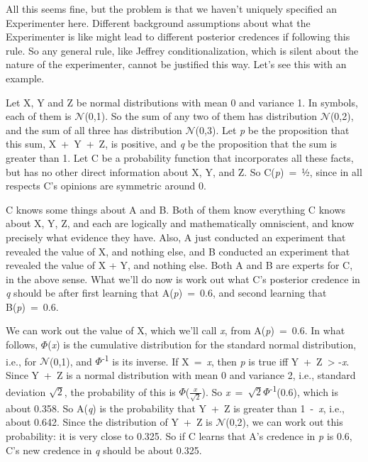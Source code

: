 \documentclass[
  10pt,
  letterpaper,
  DIV=11,
  numbers=noendperiod,
  twoside]{scrartcl}
\begin{document}
All this seems fine, but the problem is that we haven't uniquely
specified an Experimenter here. Different background assumptions about
what the Experimenter is like might lead to different posterior
credences if following this rule. So any general rule, like Jeffrey
conditionalization, which is silent about the nature of the
experimenter, cannot be justified this way. Let's see this with an
example.

Let X, Y and Z be normal distributions with mean 0 and variance 1. In
symbols, each of them is \(\mathcal{N}\)(0,1). So the sum of any two of
them has distribution \(\mathcal{N}\)(0,2), and the sum of all three has
distribution \(\mathcal{N}\)(0,3). Let \emph{p} be the proposition that
this sum, X~+~Y~+~Z, is positive, and \emph{q} be the proposition that
the sum is greater than 1. Let C be a probability function that
incorporates all these facts, but has no other direct information about
X, Y, and Z. So C(\emph{p})~=~½, since in all respects C's opinions are
symmetric around 0.

C knows some things about A and B. Both of them know everything C knows
about X, Y, Z, and each are logically and mathematically omniscient, and
know precisely what evidence they have. Also, A just conducted an
experiment that revealed the value of X, and nothing else, and B
conducted an experiment that revealed the value of X + Y, and nothing
else. Both A and B are experts for C, in the above sense. What we'll do
now is work out what C's posterior credence in \emph{q} should be after
first learning that A(\emph{p})~=~0.6, and second learning that
B(\emph{p})~=~0.6.

We can work out the value of X, which we'll call \emph{x}, from
A(\emph{p})~=~0.6. In what follows, \(\Phi\)(\emph{x}) is the cumulative
distribution for the standard normal distribution, i.e., for
\(\mathcal{N}\)(0,1), and \(\Phi\)\textsuperscript{-1} is its inverse.
If X~=~\emph{x}, then \emph{p} is true iff Y~+~Z~\textgreater{}
-\emph{x}. Since Y~+~Z is a normal distribution with mean 0 and variance
2, i.e., standard deviation \(\sqrt{2}\), the probability of this is
\(\Phi\)(\(\frac{x}{\sqrt{2}}\)). So
\emph{x}~=~\(\sqrt{2}\Phi\)\textsuperscript{-1}(0.6), which is about
0.358. So A(\emph{q}) is the probability that Y~+~Z is greater than
1~-~\emph{x}, i.e., about 0.642. Since the distribution of Y~+~Z is
\(\mathcal{N}\)(0,2), we can work out this probability: it is very close
to 0.325. So if C learns that A's credence in \emph{p} is 0.6, C's new
credence in \emph{q} should be about 0.325.
\end{document}
